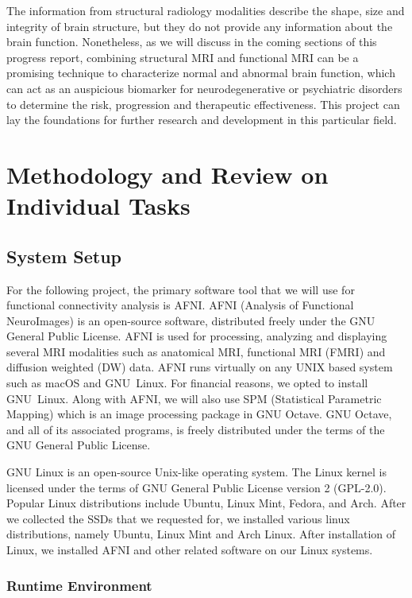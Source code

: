 \documentclass[12pt]{article}
\begin{document}
The information from structural radiology modalities describe the
shape, size and integrity of brain structure, but they do not provide
any information about the brain function. Nonetheless, as we will
discuss in the coming sections of this progress report, combining
structural MRI and functional MRI can be a promising technique to
characterize normal and abnormal brain function, which can act as an
auspicious biomarker for neurodegenerative or psychiatric disorders to
determine the risk, progression and therapeutic effectiveness. This
project can lay the foundations for further research and development
in this particular field.


\newpage
\section{Methodology and Review on Individual Tasks}

\subsection{System Setup}%
\label{sub:system_setup}

For the following project, the primary software tool that we will use
for functional connectivity analysis is AFNI. AFNI (Analysis of
Functional NeuroImages) is an open-source software, distributed
freely under the GNU General Public License.  AFNI is used for
processing, analyzing and displaying several MRI modalities such as
anatomical MRI, functional MRI (FMRI) and diffusion weighted (DW)
data. AFNI runs virtually on any UNIX based system such as macOS and
GNU~Linux. For financial reasons, we opted to install GNU~Linux. Along
with AFNI, we will also use SPM (Statistical Parametric Mapping) which
is an image processing package in GNU Octave. GNU Octave, and all of
its associated programs, is freely distributed under the terms of the
GNU General Public License.

GNU Linux is an open-source Unix-like operating system. The Linux
kernel is licensed under the terms of GNU General Public License
version 2 (GPL-2.0). Popular Linux distributions include Ubuntu,
Linux Mint, Fedora, and Arch. After we collected the SSDs that we
requested for, we installed various linux distributions, namely
Ubuntu, Linux Mint and Arch Linux. After installation of Linux, we
installed AFNI and other related software on our Linux systems.

\subsubsection{Runtime Environment}%
\label{ssub:runtime_environment}
\end{document}
